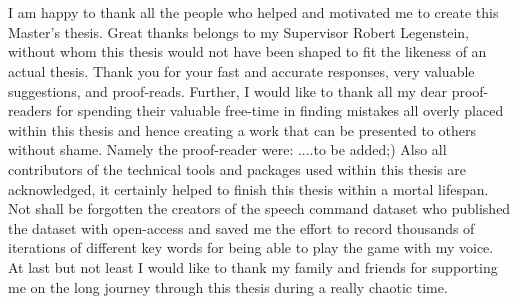 
\chapter*{}
I am happy to thank all the people who helped and motivated me to create this Master's thesis.
Great thanks belongs to my Supervisor Robert Legenstein, without whom this thesis would not have been shaped to fit the likeness of an actual thesis.
Thank you for your fast and accurate responses, very valuable suggestions, and proof-reads.
Further, I would like to thank all my dear proof-readers for spending their valuable free-time in finding mistakes all overly placed within this thesis and hence creating a work that can be presented to others without shame.
Namely the proof-reader were: ....to be added;)
Also all contributors of the technical tools and packages used within this thesis are acknowledged, it certainly helped to finish this thesis within a mortal lifespan.
Not shall be forgotten the creators of the speech command dataset who published the dataset with open-access and saved me the effort to record thousands of iterations of different key words for being able to play the game with my voice.
At last but not least I would like to thank my family and friends for supporting me on the long journey through this thesis during a really chaotic time.